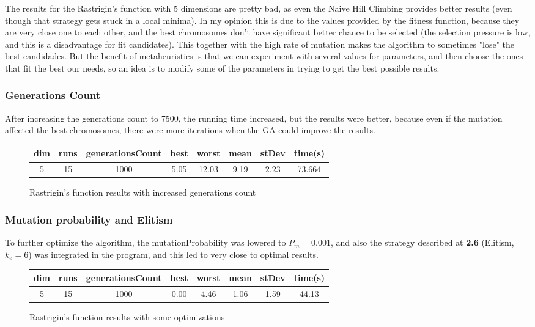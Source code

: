 \documentclass[a4paper]{article}
\begin{document}
	The results for the Rastrigin's function with 5 dimensions are pretty bad, as even the Naive Hill Climbing provides better results (even though that strategy gets stuck in a local minima). In my opinion this is due to the values provided by the fitness function, because they are very close one to each other, and the best chromosomes don't have significant better chance to be selected (the selection pressure is low, and this is a disadvantage for fit candidates). This together with the high rate of mutation makes the algorithm to sometimes "lose" the best candidades. But the benefit of metaheuristics is that we can experiment with several values for parameters, and then choose the ones that fit the best our needs, so an idea is to modify some of the parameters in trying to get the best possible results.
	
	\subsubsection{Generations Count}
	
	After increasing the generations count to 7500, the running time increased, but the results were better, because even if the mutation affected the best chromosomes, there were more iterations when the GA could improve the results.
	
	\begin{figure}[!h]
		\centering
		\begin{tabular}{|| c | c | c | c | c | c | c | c ||}
			\hline
			dim & runs & generationsCount & best & worst & mean & stDev & time(s) \\ \hline \hline
			5 & 15 & 1000 & 5.05 & 12.03 & 9.19 & 2.23 & 73.664 \\ \hline
		\end{tabular}
		\caption{Rastrigin's function results with increased generations count}
	\end{figure}
	
	\subsubsection{Mutation probability and Elitism}
	
	To further optimize the algorithm, the mutationProbability was lowered to $P_{m} = 0.001$, and also the strategy described at \textbf{2.6} (Elitism, $k_{e} = 6$) was integrated in the program, and this led to very close to optimal results.
	
	\begin{figure}[!h]
		\centering
		\begin{tabular}{|| c | c | c | c | c | c | c | c ||}
			\hline
			dim & runs & generationsCount & best & worst & mean & stDev & time(s) \\ \hline \hline
			5 & 15 & 1000 & 0.00 & 4.46 & 1.06 & 1.59 & 44.13 \\ \hline
		\end{tabular}
		\caption{Rastrigin's function results with some optimizations}
	\end{figure}
	
\end{document}

